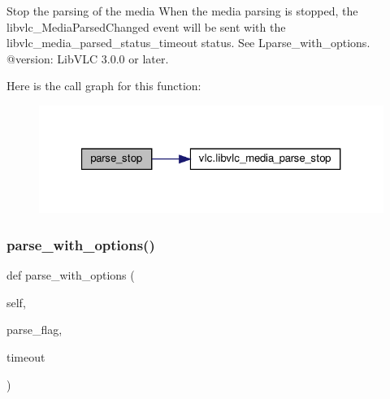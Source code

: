 \begin{DoxyVerb}Stop the parsing of the media
When the media parsing is stopped, the libvlc_MediaParsedChanged event will
be sent with the libvlc_media_parsed_status_timeout status.
See L{parse_with_options}.
@version: LibVLC 3.0.0 or later.
\end{DoxyVerb}
 Here is the call graph for this function\+:
\nopagebreak
\begin{figure}[H]
\begin{center}
\leavevmode
\includegraphics[width=321pt]{classvlc_1_1_media_a2c7754adad2befe128c3a1ec5c914d67_cgraph}
\end{center}
\end{figure}
\mbox{\label{classvlc_1_1_media_afb65081211e54102a385d0557edea812}} 
\subsubsection{\texorpdfstring{parse\+\_\+with\+\_\+options()}{parse\_with\_options()}}
{\footnotesize\ttfamily def parse\+\_\+with\+\_\+options (\begin{DoxyParamCaption}\item[{}]{self,  }\item[{}]{parse\+\_\+flag,  }\item[{}]{timeout }\end{DoxyParamCaption})}


